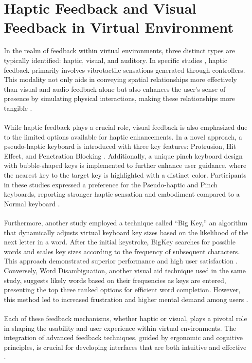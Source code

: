 \section{Haptic Feedback and Visual Feedback in Virtual Environment}

In the realm of feedback within virtual environments, three distinct types are typically identified: haptic, visual, and auditory. In specific studies \cite{teather2020flik, kruger2018text}, haptic feedback primarily involves vibrotactile sensations generated through controllers. This modality not only aids in conveying spatial relationships more effectively than visual and audio feedback alone but also enhances the user’s sense of presence by simulating physical interactions, making these relationships more tangible \cite{hayward2022xr}. \\ \\
While haptic feedback plays a crucial role, visual feedback is also emphasized due to the limited options available for haptic enhancements. In a novel approach, a pseudo-haptic keyboard is introduced with three key features: Protrusion, Hit Effect, and Penetration Blocking \cite{pseudoHaptics2022}. Additionally, a unique pinch keyboard design with bubble-shaped keys is implemented to further enhance user guidance, where the nearest key to the target key is highlighted with a distinct color. Participants in these studies expressed a preference for the Pseudo-haptic and Pinch keyboards, reporting stronger haptic sensation and embodiment compared to a Normal keyboard \cite{zhang2017deep}.\\ \\
Furthermore, another study \cite{teather2020flik} employed a technique called “Big Key,” an algorithm that dynamically adjusts virtual keyboard key sizes based on the likelihood of the next letter in a word. After the initial keystroke, BigKey searches for possible words and scales key sizes according to the frequency of subsequent characters. This approach demonstrated superior performance and high user satisfaction \cite{mcgill2015dovetail}. Conversely, Word Disambiguation, another visual aid technique used in the same study, suggests likely words based on their frequencies as keys are entered, presenting the top three ranked options for efficient word completion. However, this method led to increased frustration and higher mental demand among users \cite{baljko2006automatic}.\\ \\
Each of these feedback mechanisms, whether haptic or visual, plays a pivotal role in shaping the usability and user experience within virtual environments. The integration of advanced feedback techniques, guided by ergonomic and cognitive principles, is crucial for developing interfaces that are both intuitive and effective \cite{jacko2009human, norman2013design}.

